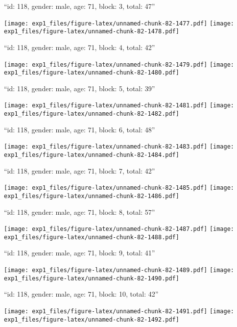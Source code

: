 \documentclass[11pt,,]{article}
\begin{document}
\newpage
[1] 

``id: 118, gender: male, age: 71, block: 3, total: 47''

\texttt{[image: exp1\_files/figure-latex/unnamed-chunk-82-1477.pdf]}
\texttt{[image: exp1\_files/figure-latex/unnamed-chunk-82-1478.pdf]}

\newpage
[1] 

``id: 118, gender: male, age: 71, block: 4, total: 42''

\texttt{[image: exp1\_files/figure-latex/unnamed-chunk-82-1479.pdf]}
\texttt{[image: exp1\_files/figure-latex/unnamed-chunk-82-1480.pdf]}

\newpage
[1] 

``id: 118, gender: male, age: 71, block: 5, total: 39''

\texttt{[image: exp1\_files/figure-latex/unnamed-chunk-82-1481.pdf]}
\texttt{[image: exp1\_files/figure-latex/unnamed-chunk-82-1482.pdf]}

\newpage
[1] 

``id: 118, gender: male, age: 71, block: 6, total: 48''

\texttt{[image: exp1\_files/figure-latex/unnamed-chunk-82-1483.pdf]}
\texttt{[image: exp1\_files/figure-latex/unnamed-chunk-82-1484.pdf]}

\newpage
[1] 

``id: 118, gender: male, age: 71, block: 7, total: 42''

\texttt{[image: exp1\_files/figure-latex/unnamed-chunk-82-1485.pdf]}
\texttt{[image: exp1\_files/figure-latex/unnamed-chunk-82-1486.pdf]}

\newpage
[1] 

``id: 118, gender: male, age: 71, block: 8, total: 57''

\texttt{[image: exp1\_files/figure-latex/unnamed-chunk-82-1487.pdf]}
\texttt{[image: exp1\_files/figure-latex/unnamed-chunk-82-1488.pdf]}

\newpage
[1] 

``id: 118, gender: male, age: 71, block: 9, total: 41''

\texttt{[image: exp1\_files/figure-latex/unnamed-chunk-82-1489.pdf]}
\texttt{[image: exp1\_files/figure-latex/unnamed-chunk-82-1490.pdf]}

\newpage
[1] 

``id: 118, gender: male, age: 71, block: 10, total: 42''

\texttt{[image: exp1\_files/figure-latex/unnamed-chunk-82-1491.pdf]}
\texttt{[image: exp1\_files/figure-latex/unnamed-chunk-82-1492.pdf]}
\end{document}
